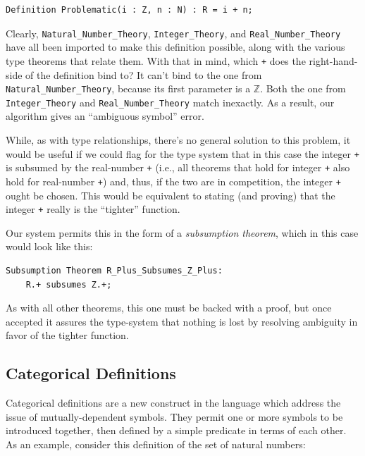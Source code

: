 \begin{lstlisting}
Definition Problematic(i : Z, n : N) : R = i + n;
\end{lstlisting}

Clearly, \texttt{Natural\_Number\_Theory}, \texttt{Integer\_Theory}, and \texttt{Real\_Number\_Theory} have all been imported to make this definition possible, along with the various type theorems that relate them.  With that in mind, which \texttt{+} does the right-hand-side of the definition bind to?  It can't bind to the one from \texttt{Natural\_Number\_Theory}, because its first parameter is a $\mathbb{Z}$.  Both the one from \texttt{Integer\_Theory} and \texttt{Real\_Number\_Theory} match inexactly.  As a result, our algorithm gives an ``ambiguous symbol'' error.

While, as with type relationships, there's no general solution to this problem, it would be useful if we could flag for the type system that in this case the integer \texttt{+} is subsumed by the real-number \texttt{+} (i.e., all theorems that hold for integer \texttt{+} also hold for real-number \texttt{+}) and, thus, if the two are in competition, the integer \texttt{+} ought be chosen.  This would be equivalent to stating (and proving) that the integer \texttt{+} really is the ``tighter'' function.

Our system permits this in the form of a \emph{subsumption theorem}, which in this case would look like this:

\begin{lstlisting}
Subsumption Theorem R_Plus_Subsumes_Z_Plus:
	R.+ subsumes Z.+;
\end{lstlisting}

As with all other theorems, this one must be backed with a proof, but once accepted it assures the type-system that nothing is lost by resolving ambiguity in favor of the tighter function.


	\subsection{Categorical Definitions\label{sec:categoricalDefinitions}}

Categorical definitions are a new construct in the language which address the issue of mutually-dependent symbols.  They permit one or more symbols to be introduced together, then defined by a simple predicate in terms of each other.  As an example, consider this definition of the set of natural numbers:

